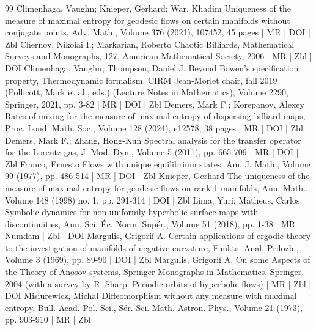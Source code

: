 \documentclass[10pt]{amsart}
\theoremstyle{definition}\newtheorem{defi}[theo]{Definition}\newtheorem{rema}[theo]{Remark}\newtheorem{exam}[theo]{Example}\newtheorem{exem}[theo]{Example}\newtheorem{nota}[theo]{Notation}
\begin{document}
\begin{thebibliography}{99}
Climenhaga, Vaughn; Knieper, Gerhard; War, Khadim Uniqueness of the measure of maximal entropy for geodesic flows on certain manifolds without conjugate points, Adv. Math., Volume 376 (2021), 107452, 45 pages | MR | DOI | Zbl
Chernov, Nikolai I.; Markarian, Roberto Chaotic Billiards, Mathematical Surveys and Monographs, 127, American Mathematical Society, 2006 | MR | Zbl | DOI
Climenhaga, Vaughn; Thompson, Daniel J. Beyond Bowen’s specification property, Thermodynamic formalism. CIRM Jean-Morlet chair, fall 2019 (Pollicott, Mark et al., eds.) (Lecture Notes in Mathematics), Volume 2290, Springer, 2021, pp. 3-82 | MR | DOI | Zbl
Demers, Mark F.; Korepanov, Alexey Rates of mixing for the measure of maximal entropy of dispersing billiard maps, Proc. Lond. Math. Soc., Volume 128 (2024), e12578, 38 pages | MR | DOI | Zbl
Demers, Mark F.; Zhang, Hong-Kun Spectral analysis for the transfer operator for the Lorentz gas, J. Mod. Dyn., Volume 5 (2011), pp. 665-709 | MR | DOI | Zbl
Franco, Ernesto Flows with unique equilibrium states, Am. J. Math., Volume 99 (1977), pp. 486-514 | MR | DOI | Zbl
Knieper, Gerhard The uniqueness of the measure of maximal entropy for geodesic flows on rank 1 manifolds, Ann. Math., Volume 148 (1998) no. 1, pp. 291-314 | DOI | Zbl
Lima, Yuri; Matheus, Carlos Symbolic dynamics for non-uniformly hyperbolic surface maps with discontinuities, Ann. Sci. Éc. Norm. Supér., Volume 51 (2018), pp. 1-38 | MR | Numdam | Zbl | DOI
Margulis, Grigoriĭ A. Certain applications of ergodic theory to the investigation of manifolds of negative curvature, Funkts. Anal. Prilozh., Volume 3 (1969), pp. 89-90 | DOI | Zbl
Margulis, Grigoriĭ A. On some Aspects of the Theory of Anosov systems, Springer Monographs in Mathematics, Springer, 2004 (with a survey by R. Sharp: Periodic orbits of hyperbolic flows) | MR | Zbl | DOI
Misiurewicz, Michał Diffeomorphism without any measure with maximal entropy, Bull. Acad. Pol. Sci., Sér. Sci. Math. Astron. Phys., Volume 21 (1973), pp. 903-910 | MR | Zbl
\end{thebibliography}
\end{document}
